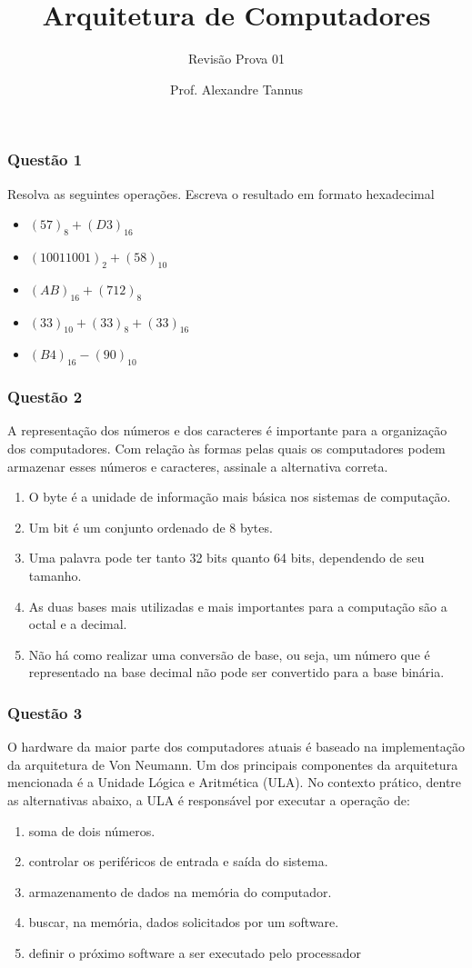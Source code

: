 \documentclass[	aspectratio=169,
				xcolor=table]{beamer}
\title[]{Arquitetura de Computadores}
\subtitle[]{Revisão Prova 01}
\author[]{Prof. Alexandre Tannus}
\date{}
\begin{document}
	\begin{frame}
		\frametitle{Questão 1}
		\Large Resolva as seguintes operações. Escreva o resultado em formato hexadecimal
		
		\begin{itemize}
			\item $(57)_{8} + (D3)_{16}$
			\item $(10011001)_{2} + (58)_{10}$
			\item $(AB)_{16} + (712)_{8}$
			\item $(33)_{10} + (33)_{8} + (33)_{16}$	
			\item $(B4)_{16} - (90)_{10}$	
		\end{itemize}
		
	\end{frame}
	
	\begin{frame}
		\frametitle{Questão 2}
		A representação dos números e dos caracteres é importante para a organização dos computadores. Com relação às formas pelas quais os computadores podem armazenar esses números e caracteres, assinale a alternativa correta. 
		\begin{enumerate}[a]
			\large
			\item O byte é a unidade de informação mais básica nos sistemas de computação. 
			\item Um bit é um conjunto ordenado de 8 bytes. 
			\item Uma palavra pode ter tanto 32 bits quanto 64 bits, dependendo de seu tamanho.
			\item As duas bases mais utilizadas e mais importantes para a computação são a octal e a decimal. 
			\item Não há como realizar uma conversão de base, ou seja, um número que é representado na base decimal não pode ser convertido para a base binária.
		
		\end{enumerate}

	\end{frame}
	
	\begin{frame}
		\frametitle{Questão 3}
		O hardware da maior parte dos computadores atuais é baseado na implementação da arquitetura de Von Neumann. Um dos principais componentes da arquitetura mencionada é a Unidade Lógica e Aritmética (ULA). No contexto prático, dentre as alternativas abaixo, a ULA é responsável por executar a operação de:
		
		\begin{enumerate}[a]
			\large
			\item soma de dois números.
			\item controlar os periféricos de entrada e saída do sistema.
			\item armazenamento de dados na memória do computador.
			\item buscar, na memória, dados solicitados por um software.
			\item definir o próximo software a ser executado pelo processador		
		\end{enumerate}
	\end{frame}
	
\end{document}
